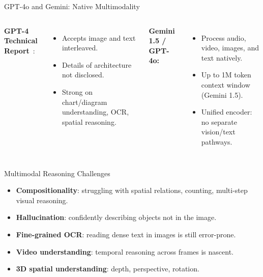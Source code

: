 \documentclass[aspectratio=169,10pt]{beamer}
\begin{document}
\begin{frame}{GPT-4o and Gemini: Native Multimodality}
  \begin{columns}[T]
      \textbf{GPT-4 Technical Report}~\cite{openai2023gpt4}:
      \begin{itemize}
        \item Accepts image and text interleaved.
        \item Details of architecture not disclosed.
        \item Strong on chart/diagram understanding, OCR, spatial reasoning.
      \end{itemize}
      \vspace{0.4em}
      \textbf{Gemini 1.5 / GPT-4o:}
      \begin{itemize}
        \item Process audio, video, images, and text natively.
        \item Up to 1M token context window (Gemini 1.5).
        \item Unified encoder: no separate vision/text pathways.
      \end{itemize}
  \end{columns}
\end{frame}

\begin{frame}{Multimodal Reasoning Challenges}
  \begin{tcolorbox}[alertbox, title=Current Limitations]
    \begin{itemize}
      \item \textbf{Compositionality}: struggling with spatial relations, counting, multi-step visual reasoning.
      \item \textbf{Hallucination}: confidently describing objects not in the image.
      \item \textbf{Fine-grained OCR}: reading dense text in images is still error-prone.
      \item \textbf{Video understanding}: temporal reasoning across frames is nascent.
      \item \textbf{3D spatial understanding}: depth, perspective, rotation.
    \end{itemize}
  \end{tcolorbox}
\end{frame}
\end{document}
